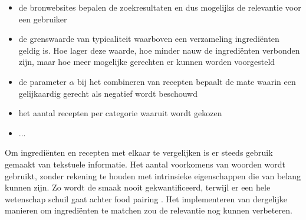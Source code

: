 \documentclass{hogent-article}
\begin{document}
\begin{itemize}
    \item de bronwebsites bepalen de zoekresultaten en dus mogelijks de relevantie voor een gebruiker
    \item de grenswaarde van typicaliteit \autocite{Yokoi2015} waarboven een verzameling ingrediënten geldig is. Hoe lager deze waarde, hoe minder nauw de ingrediënten verbonden zijn, maar hoe meer mogelijke gerechten er kunnen worden voorgesteld
    \item de parameter $\alpha$ bij het combineren van recepten bepaalt de mate waarin een gelijkaardig gerecht als negatief wordt beschouwd
    \item het aantal recepten per categorie waaruit wordt gekozen
    \item ...
\end{itemize}

Om ingrediënten en recepten met elkaar te vergelijken is er steeds gebruik gemaakt van tekstuele informatie. Het aantal voorkomens van woorden wordt gebruikt, zonder rekening te houden met intrinsieke eigenschappen die van belang kunnen zijn. Zo wordt de smaak nooit gekwantificeerd, terwijl er een hele wetenschap schuil gaat achter food pairing \autocite{Ahn2011}. Het implementeren van dergelijke manieren om ingrediënten te matchen zou de relevantie nog kunnen verbeteren. 



\printbibliography[heading=bibintoc, title={References}] 
\end{document}
